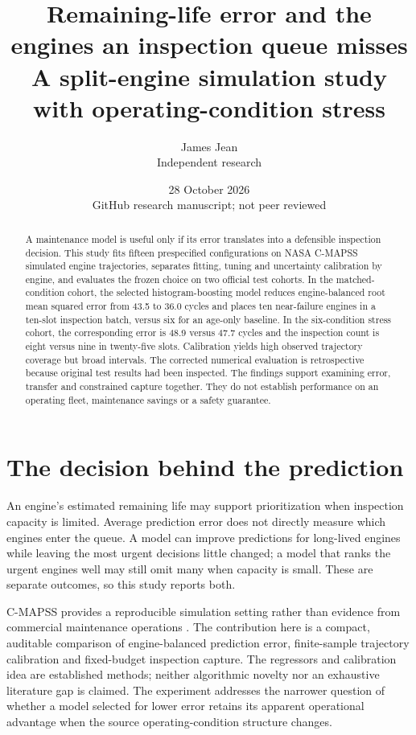 \documentclass[11pt]{article}
\title{Remaining-life error and the engines an inspection queue misses\\\large A split-engine simulation study with operating-condition stress}
\author{James Jean\\Independent research}
\date{28 October 2026\\GitHub research manuscript; not peer reviewed}
\begin{document}
\maketitle
\begin{abstract}
A maintenance model is useful only if its error translates into a defensible inspection decision. This study fits fifteen prespecified configurations on NASA C-MAPSS simulated engine trajectories, separates fitting, tuning and uncertainty calibration by engine, and evaluates the frozen choice on two official test cohorts. In the matched-condition cohort, the selected histogram-boosting model reduces engine-balanced root mean squared error from 43.5 to 36.0 cycles and places ten near-failure engines in a ten-slot inspection batch, versus six for an age-only baseline. In the six-condition stress cohort, the corresponding error is 48.9 versus 47.7 cycles and the inspection count is eight versus nine in twenty-five slots. Calibration yields high observed trajectory coverage but broad intervals. The corrected numerical evaluation is retrospective because original test results had been inspected. The findings support examining error, transfer and constrained capture together. They do not establish performance on an operating fleet, maintenance savings or a safety guarantee.
\end{abstract}
\section{The decision behind the prediction}
An engine's estimated remaining life may support prioritization when inspection capacity is limited. Average prediction error does not directly measure which engines enter the queue. A model can improve predictions for long-lived engines while leaving the most urgent decisions little changed; a model that ranks the urgent engines well may still omit many when capacity is small. These are separate outcomes, so this study reports both.

C-MAPSS provides a reproducible simulation setting rather than evidence from commercial maintenance operations \cite{nasa,saxena}. The contribution here is a compact, auditable comparison of engine-balanced prediction error, finite-sample trajectory calibration and fixed-budget inspection capture. The regressors and calibration idea are established methods; neither algorithmic novelty nor an exhaustive literature gap is claimed. The experiment addresses the narrower question of whether a model selected for lower error retains its apparent operational advantage when the source operating-condition structure changes.
\end{document}
